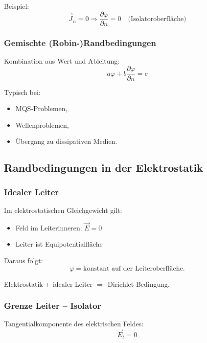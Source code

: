 \documentclass[a4paper]{article}
\newcommand{\E}{\vec E}
\newcommand{\J}{\vec J}
\begin{document}
Beispiel:
\[
\J_n = 0 \Rightarrow \frac{\partial \varphi}{\partial n} = 0
\quad \text{(Isolatoroberfläche)}
\]

\subsubsection{Gemischte (Robin-)Randbedingungen}

Kombination aus Wert und Ableitung:
\[
a\varphi + b\frac{\partial \varphi}{\partial n} = c
\]

Typisch bei:
\begin{itemize}
  \item MQS-Problemen,
  \item Wellenproblemen,
  \item Übergang zu dissipativen Medien.
\end{itemize}

\subsection{Randbedingungen in der Elektrostatik}

\subsubsection{Idealer Leiter}

Im elektrostatischen Gleichgewicht gilt:
\begin{itemize}
  \item Feld im Leiterinneren: $\E = 0$
  \item Leiter ist Equipotentialfläche
\end{itemize}

Daraus folgt:
\[
\varphi = \text{konstant auf der Leiteroberfläche}.
\]

\begin{schema}
Elektrostatik + idealer Leiter $\Rightarrow$ Dirichlet-Bedingung.
\end{schema}

\subsubsection{Grenze Leiter -- Isolator}

Tangentialkomponente des elektrischen Feldes:
\[
\E_t = 0
\]
\end{document}
